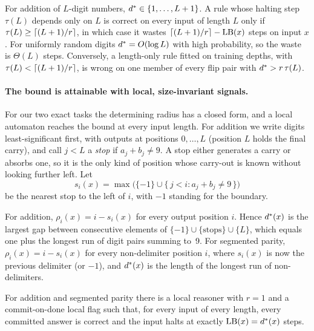 \begin{corollary}\label{cor:length}
For addition of $L$-digit numbers, $d^{*}\in\{1,\dots,L+1\}$. A rule whose halting step $\tau(L)$
depends only on $L$ is correct on every input of length $L$ only if $\tau(L)\ge\lceil(L+1)/r\rceil$, in
which case it wastes $\lceil(L+1)/r\rceil-\operatorname{LB}(x)$ steps on input $x$. For uniformly random digits
$d^{*} = O(\log L)$ with high probability, so the waste is $\Theta(L)$ steps. Conversely, a
length-only rule fitted on training depths, with $\tau(L) < \lceil(L+1)/r\rceil$, is wrong on one member of
every flip pair with $d^{*} > r\,\tau(L)$.
\end{corollary}

\paragraph{The bound is attainable with local, size-invariant signals.}
For our two exact tasks the determining radius has a closed form, and a local automaton reaches the
bound at every input length. For addition we write digits least-significant first, with outputs at
positions $0,\dots,L$ (position $L$ holds the final carry), and call $j<L$ a \emph{stop} if
$a_j+b_j\ne 9$. A stop either generates a carry or absorbs one, so it is the only kind of position
whose carry-out is known without looking further left. Let
\begin{equation}
  s_i(x) = \max\bigl(\{-1\}\cup\{\,j<i : a_j+b_j\ne 9\,\}\bigr)
  \label{eq:stop}
\end{equation}
be the nearest stop to the left of $i$, with $-1$ standing for the boundary.

\begin{proposition}\label{prop:oracles}
For addition, $\rho_i(x) = i - s_i(x)$ for every output position $i$. Hence $d^{*}(x)$ is the largest
gap between consecutive elements of $\{-1\}\cup\{\text{stops}\}\cup\{L\}$, which equals one plus the
longest run of digit pairs summing to~9. For segmented parity, $\rho_i(x) = i - s_i(x)$ for every
non-delimiter position $i$, where $s_i(x)$ is now the previous delimiter (or $-1$), and $d^{*}(x)$ is the
length of the longest run of non-delimiters.
\end{proposition}

\begin{proposition}[Achievability]\label{prop:automaton}
For addition and segmented parity there is a local reasoner with $r=1$ and a commit-on-done local flag
such that, for every input of every length, every committed answer is correct and the input halts at
exactly $\operatorname{LB}(x)=d^{*}(x)$ steps.
\end{proposition}

